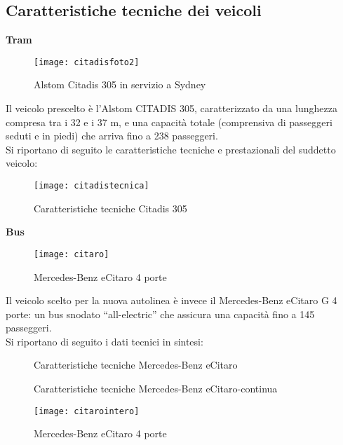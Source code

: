 \documentclass{article}
\begin{document}
\subsection{Caratteristiche tecniche dei veicoli}
\textbf{Tram}\\
\begin{figure}[H]
\centering
\texttt{[image: citadisfoto2]}
\caption{Alstom Citadis 305 in servizio a Sydney}
\end{figure}
Il veicolo prescelto è l’Alstom CITADIS 305, caratterizzato da una lunghezza compresa tra i 32 e i 37 m, e una capacità totale (comprensiva di passeggeri seduti e in piedi) che arriva fino a 238 passeggeri.\\
\newpage
Si riportano di seguito le caratteristiche tecniche e prestazionali del suddetto veicolo: 
\begin{figure}[H]
\centering
\texttt{[image: citadistecnica]}
\caption{Caratteristiche tecniche Citadis 305 \cite{citadis}}
\end{figure}
\textbf{Bus}\\
\begin{figure}[H]
\centering
\texttt{[image: citaro]}
\caption{Mercedes-Benz eCitaro 4 porte}
\end{figure}
Il veicolo scelto per la nuova autolinea è invece il Mercedes-Benz eCitaro G 4 porte: un bus snodato “all-electric” che assicura una capacità fino a 145 passeggeri.\\
\newpage
Si riportano di seguito i dati tecnici in sintesi: 
\begin{figure}[H]
\centering
{}
\qquad
{}
\caption{Caratteristiche tecniche Mercedes-Benz eCitaro \cite{citaro}}
\end{figure}
\begin{figure}[H]
\centering
{}
\qquad
{}
\caption{Caratteristiche tecniche Mercedes-Benz eCitaro-continua \cite{citaro}}
\end{figure}
\begin{figure}[H]
\centering
\texttt{[image: citarointero]}
\caption{Mercedes-Benz eCitaro 4 porte}
\end{figure}
\end{document}
